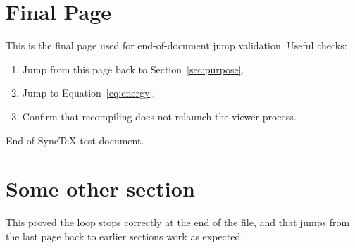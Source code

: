 \documentclass{article}
\newcommand{\getangle}[3]{%
    \pgfmathanglebetweenpoints{\pgfpointanchor{#2}{center}}
                              {\pgfpointanchor{#3}{center}}
    \global\let#1\pgfmathresult  
}
\def\engine#1{
  \def\R{2}    %
  \def\Ra{1.8} %
  \def\l{5.0}  %
  \def\w{0.2}  %
  \def\wa{0.3} %
  \def\ha{1.5} %
  \def\wp{3.8} %
  \def\hp{2.0} %
  \def\wt{1.0} %
  \def\W{4.0}  %
  \def\H{8.4}  %
  \def\T{2.5}  %
  \def\cl{1.3} %
  \def\ct{.25} %
  \def\rb{0.1} %
  \def\d{.4*\R}
  \coordinate (O)   at (0,0);
  \coordinate (R)   at (#1:\Ra);
  \coordinate (Pc)  at (0,{\Ra*sin(#1)-sqrt(\l^2-(\Ra*cos(#1))^2)});
  \coordinate (Ph)  at ({\Ra*cos(#1)+sqrt(\l^2-(\Ra*sin(#1))^2)},0);
  \getangle{\ac}{Pc}{R}
  \getangle{\ah}{Ph}{R}
  
  \fill[gas]
    (\W/2-\wt,-\R-\d-\H) \pipeoutside --++
    (0,-\wt) |-++ (-\H,-\H-\d);
  \fill[cold gas] (Pc) ++ (-\W/2,-\ha-.2*\hp) rectangle (\W/2,-\R-\d-\H-.01);
  \fill[hot gas] (Ph) ++ (\ha+.2*\hp,-\W/2) rectangle (\R+\d+\H+.01,\W/2);
  
  \draw[very thick,mydarkblue,top color=blue!20!black!40,bottom color=blue!20!black!50,shading angle=0]
    (O) circle (\R);
  \draw[knob] (O) circle (.25*\R);
  
  \draw[arm1,shading angle=\ac-90]
    (Pc) ++ (\ac-90:\w) arc (\ac-90:\ac-270:\w) --
    ($(R)+(\ac-270:\w)$) arc (\ac+90:\ac-90:\w) -- cycle;
  \draw[piston1]
    (Pc) ++ (180:\wa) arc (180:0:\wa) --++ (0,-\ha) --++
    (\wp/2-\wa,0) --++ (0,-\hp) coordinate[midway] (L) --++
    (-\wp,0) --++ (0,\hp) --++ (\wp/2-\wa,0) -- cycle;
  \draw[knob] (R) circle (\rb);a
  \draw[knob] (Pc) circle (\rb);
  
  \draw[arm2,shading angle=\ah-90]
    (Ph) ++ (\ah-90:\w) arc (\ah-90:\ah-270:\w) --
    ($(R)+(\ah-270:\w)$) arc (\ah+90:\ah-90:\w) -- cycle;
  \draw[piston2]
    (Ph) ++ (270:\wa) arc (270:90:\wa) --++ (\ha,0) --++
    (0,\wp/2-\wa) --++ (\hp,0) --++ (0,-\wp) --++ (-\hp,0) --++ (0,\wp/2-\wa) -- cycle;
  \draw[knob] (R) circle (\rb);
  \draw[knob] (Ph) circle (\rb);
  
  \foreach \x in {-1,1}{
    \draw[mydarkblue,line width=2,fill=blue!80,xscale=\x]
      (\W/2,-\R-\d-.9*\H) --++ (\ct,0) |-++
      (\cl,\ct) |-++ (-\cl,\ct) |-++
      (\cl,\ct) |-++ (-\cl,\ct) |-++
      (\cl,\ct) |-++ (-\cl,\ct) |-++
      (\cl,\ct) |-++ (-\cl,\ct) |-++
      (\cl,\ct) |-++ (-\cl,\ct) |-++
      (\cl,\ct) coordinate (C\x) |-++ (-\cl,\ct) |-++
      (-\ct,\ct);
    \draw[mydarkblue,line width=1.5,fill=red!80,yscale=\x]
      (\R+\d+.9*\H,\W/2) to[out=90,in=0]++ (-2*\ct,2*\ct) --++
      (-.3*\H,0) coordinate (H\x) to[out=180,in=90]++ (-2*\ct,-2*\ct);
  }
  
  \draw[line width=1.7,mydarkblue,double=blue!20!black!60,double distance=\T,line cap=rect]
    (-\W/2,-\R-\d) |-++ (\W-\wt,-\H)
    \pipeoutside --++ (0,\W-\wt) --++ (-\H,0)
    ( \W/2,-\R-\d) |-++ (\H+\d,-\H) |-++ (-\H,\H+\d);
}
\def\pipeoutside{
            to[out=-90,in=180]++ (\wt,-\wt) --++
  (\H+\d,0) to[out=0,in=-90]++ (\wt,\wt) --++
  (0,\H+\d) to[out=90,in=0]++ (-\wt, \wt)
}
\begin{document}
\newpage
\section{Final Page}
\label{sec:final}
This is the final page used for end-of-document jump validation.
Useful checks:
\begin{enumerate}
  \item Jump from this page back to Section~\ref{sec:purpose}.
  \item Jump to Equation~\ref{eq:energy}.
  \item Confirm that recompiling does not relaunch the viewer process.
\end{enumerate}

End of SyncTeX test document.


\newpage











\newpage



\section{Some other section}

This proved the loop stops correctly at the end of the file, and that jumps
from the last page back to earlier sections work as expected.
\end{document}
